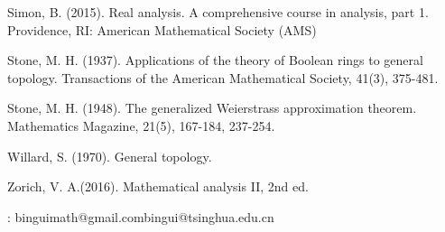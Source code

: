 \documentclass[12pt,b5paper,notitlepage]{article}
\theoremstyle{definition}
\theoremstyle{plain}
\numberwithin{equation}{section}
\begin{document}
\begin{thebibliography}{999999}
Simon, B. (2015). Real analysis. A comprehensive course in analysis, part 1. Providence, RI: American Mathematical Society (AMS)

Stone, M. H. (1937). Applications of the theory of Boolean rings to general topology. Transactions of the American Mathematical Society, 41(3), 375-481.

Stone, M. H. (1948). The generalized Weierstrass approximation theorem. Mathematics Magazine, 21(5), 167-184, 237-254.


Willard, S. (1970). General topology. 

Zorich, V. A.(2016). Mathematical analysis II, 2nd ed.

		
\end{thebibliography}


: binguimath@gmail.com\qquad bingui@tsinghua.edu.cn
\end{document}
